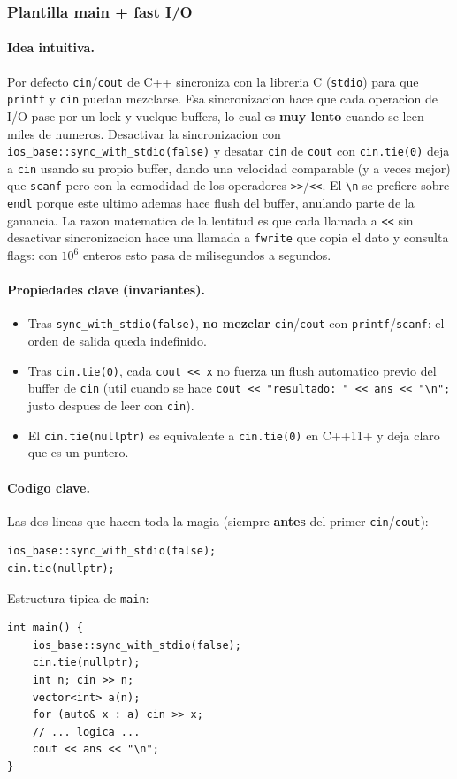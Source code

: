 ﻿\subsubsection{Plantilla main + fast I/O}

\paragraph{Idea intuitiva.}
Por defecto \texttt{cin}/\texttt{cout} de C++ sincroniza con la libreria C (\texttt{stdio}) para que \texttt{printf} y \texttt{cin} puedan mezclarse. Esa sincronizacion hace que cada operacion de I/O pase por un lock y vuelque buffers, lo cual es \textbf{muy lento} cuando se leen miles de numeros. Desactivar la sincronizacion con \texttt{ios\_base::sync\_with\_stdio(false)} y desatar \texttt{cin} de \texttt{cout} con \texttt{cin.tie(0)} deja a \texttt{cin} usando su propio buffer, dando una velocidad comparable (y a veces mejor) que \texttt{scanf} pero con la comodidad de los operadores \texttt{>>}/\texttt{<<}. El \texttt{\textbackslash n} se prefiere sobre \texttt{endl} porque este ultimo ademas hace flush del buffer, anulando parte de la ganancia. La razon matematica de la lentitud es que cada llamada a \texttt{<<} sin desactivar sincronizacion hace una llamada a \texttt{fwrite} que copia el dato y consulta flags: con $10^6$ enteros esto pasa de milisegundos a segundos.

\paragraph{Propiedades clave (invariantes).}
\begin{itemize}\setlength\itemsep{0pt}
	\item Tras \texttt{sync\_with\_stdio(false)}, \textbf{no mezclar} \texttt{cin}/\texttt{cout} con \texttt{printf}/\texttt{scanf}: el orden de salida queda indefinido.
	\item Tras \texttt{cin.tie(0)}, cada \texttt{cout << x} no fuerza un flush automatico previo del buffer de \texttt{cin} (util cuando se hace \texttt{cout << "resultado: " << ans << "\textbackslash n";} justo despues de leer con \texttt{cin}).
	\item El \texttt{cin.tie(nullptr)} es equivalente a \texttt{cin.tie(0)} en C++11+ y deja claro que es un puntero.
\end{itemize}

\paragraph{Codigo clave.}
Las dos lineas que hacen toda la magia (siempre \textbf{antes} del primer \texttt{cin}/\texttt{cout}):
\begin{verbatim}
ios_base::sync_with_stdio(false);
cin.tie(nullptr);
\end{verbatim}
Estructura tipica de \texttt{main}:
\begin{verbatim}
int main() {
    ios_base::sync_with_stdio(false);
    cin.tie(nullptr);
    int n; cin >> n;
    vector<int> a(n);
    for (auto& x : a) cin >> x;
    // ... logica ...
    cout << ans << "\n";
}
\end{verbatim}

